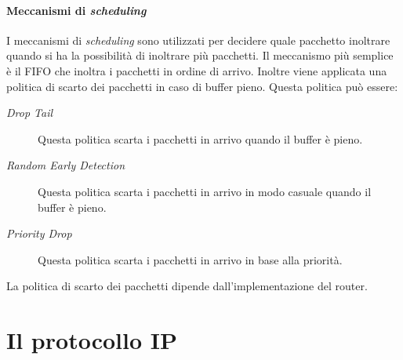         \paragraph{Meccanismi di \textit{scheduling}}
            I meccanismi di \textit{scheduling} sono utilizzati per decidere quale pacchetto inoltrare quando si ha la possibilità di inoltrare più pacchetti. Il meccanismo più semplice è il \Acrfull*{FIFO} che inoltra i pacchetti in ordine di arrivo. Inoltre viene applicata una politica di scarto dei pacchetti in caso di buffer pieno. Questa politica può essere: \begin{description}
                \item[\textit{Drop Tail}] Questa politica scarta i pacchetti in arrivo quando il buffer è pieno.
                \item[\textit{Random Early Detection}] Questa politica scarta i pacchetti in arrivo in modo casuale quando il buffer è pieno.
                \item[\textit{Priority Drop}] Questa politica scarta i pacchetti in arrivo in base alla priorità.
            \end{description}
            La politica di scarto dei pacchetti dipende dall'implementazione del router.
\section[Il protocollo \texttt{IP}]{Il protocollo \Acrshort*{IP}}
